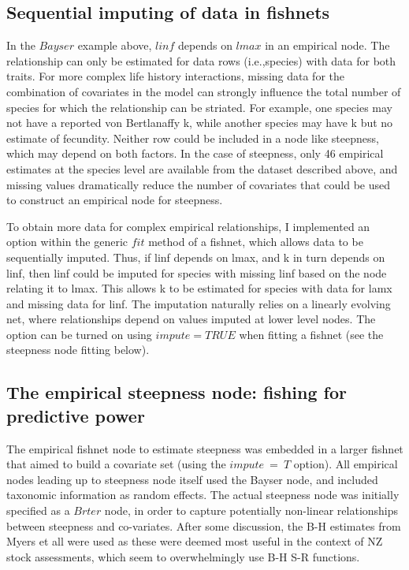 \documentclass{dragonfly-report}\usepackage[]{graphicx}\usepackage[]{color}
\begin{document}
\subsection{Sequential imputing of data in fishnets}

In the $Bayser$ example above, $linf$ depends on $lmax$ in an empirical node. The relationship can only be estimated for data rows (i.e.,species) with data for both traits. For more complex life history interactions, missing data for the combination of covariates in the model can strongly influence the total number of species for which the relationship can be striated. For example, one species may not have a reported von Bertlanaffy k, while another species may have k but no estimate of fecundity. Neither row could be included in a node like steepness, which may depend on both factors. In the case of steepness, only 46 empirical estimates at the species level are available from the dataset described above, and missing values dramatically reduce the number of covariates that could be used to construct an empirical node for steepness.

To obtain more data for complex empirical relationships, I implemented an option within the generic $fit$ method of a fishnet, which allows data to be sequentially imputed. Thus, if linf depends on lmax, and k in turn depends on linf, then linf could be imputed for species with missing linf based on the node relating it to lmax. This allows k to be estimated for species with data for lamx and missing data for linf. The imputation naturally relies on a linearly evolving net, where relationships depend on  values imputed at lower level nodes. The option can be turned on using $impute = TRUE$ when fitting a fishnet (see the steepness node fitting below).

\subsection{The empirical steepness node: fishing for predictive power}

The empirical fishnet node to estimate steepness was embedded in a larger fishnet that aimed to build a covariate set (using the $impute~=~T$ option). All empirical nodes leading up to steepness node itself used the Bayser node, and included taxonomic information as random effects. The actual steepness node was initially specified as a $Brter$ node, in order to capture potentially non-linear relationships between steepness and co-variates. After some discussion, the B-H estimates from Myers et all were used as these were deemed most useful in the context of NZ stock assessments, which seem to overwhelmingly use B-H S-R functions.
\end{document}
